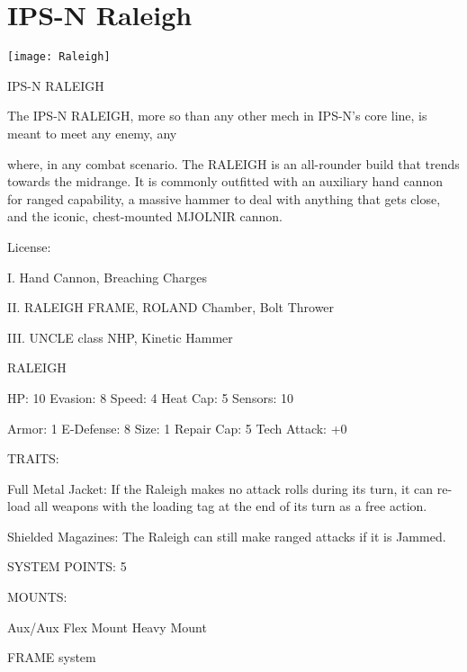 \section{IPS-N Raleigh}

\centering\texttt{[image: Raleigh]}

                                              IPS-N RALEIGH

The IPS-N RALEIGH, more so than any other mech in IPS-N’s core line, is meant to meet any enemy, any

where, in any combat scenario. The RALEIGH is an all-rounder build that trends towards the midrange. It is
commonly outfitted with an auxiliary hand cannon for ranged capability, a massive hammer to deal with
anything that gets close, and the iconic, chest-mounted MJOLNIR cannon.

                                                      License:

I. Hand Cannon, Breaching Charges

II. RALEIGH FRAME, ROLAND Chamber, Bolt Thrower

III. UNCLE class NHP, Kinetic Hammer





                                                    RALEIGH

  HP: 10          Evasion: 8                              Speed: 4            Heat Cap: 5         Sensors: 10

  Armor: 1        E-Defense: 8                            Size: 1             Repair Cap: 5       Tech Attack:
                                                                                                  +0

                                                      TRAITS:

  Full Metal Jacket: If the Raleigh makes no attack rolls during its turn, it can re-load all weapons with
  the loading tag at the end of its turn as a free action.

  Shielded Magazines: The Raleigh can still make ranged attacks if it is Jammed.

                                               SYSTEM POINTS: 5

                                                     MOUNTS:

  Aux/Aux                             Flex Mount                              Heavy Mount

                                                  FRAME system

